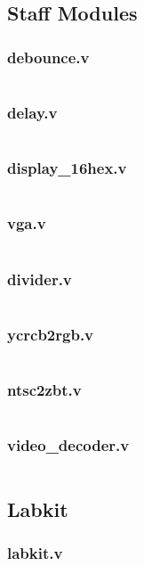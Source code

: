 \documentclass{article}
\begin{document}
\subsection{Staff Modules}
\subsubsection{debounce.v}
\inputminted[linenos]{verilog}{../../src/debounce.v}
\subsubsection{delay.v}
\inputminted[linenos]{verilog}{../../src/delay.v}
\subsubsection{display\_16hex.v}
\inputminted[linenos]{verilog}{../../src/display_16hex.v}
\subsubsection{vga.v}
\inputminted[linenos]{verilog}{../../src/vga.v}
\subsubsection{divider.v}
\inputminted[linenos]{verilog}{../../src/divider.v}
\subsubsection{ycrcb2rgb.v}
\inputminted[linenos]{verilog}{../../src/ycrcb2rgb.v}
\subsubsection{ntsc2zbt.v}
\inputminted[linenos]{verilog}{../../src/ntsc2zbt.v}
\subsubsection{video\_decoder.v}
\inputminted[linenos]{verilog}{../../src/video_decoder.v}

\subsection{Labkit}
\subsubsection{labkit.v}
\inputminted[linenos]{verilog}{../../src/labkit.v}
\end{document}
